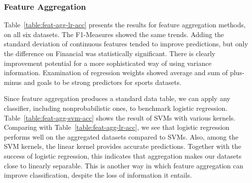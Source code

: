 \documentclass[conference]{IEEEtran}
\begin{document}

\subsubsection{Feature Aggregation}

Table~\ref{table:feat-agg-lr-acc} presents the results for feature aggregation methods, on all six datasets. The F1-Measures showed the same trends. Adding the standard deviation of continuous features tended to improve predictions, but only the difference on Financial was statistically significant. There is clearly improvement potential for a more sophisticated way of using variance information. Examination of regression weights showed average and sum of plus-minus and goals to be strong predictors for sports datasets.

Since feature aggregation produces a standard data table, we can apply any classifier, including nonprobabilistic ones, to benchmark logistic regression. Table~\ref{table:feat-agg-svm-acc} shows the result of SVMs with various kernels. Comparing with Table~\ref{table:feat-agg-lr-acc}, we see that logistic regression performs well on the aggregated datasets compared to SVMs. Also, among the SVM kernels, the linear kernel provides accurate predictions. Together with the success of logistic regression, this indicates that aggregation makes our datasets close to linearly separable. This is another way in which feature aggregation can improve classification, despite the loss of information it entails.
\end{document}

